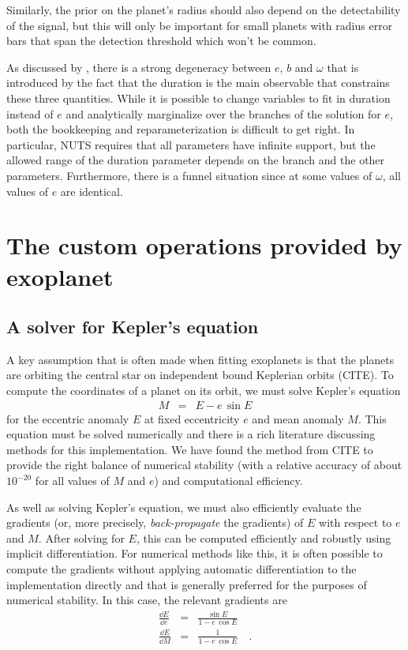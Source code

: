 \documentclass[modern]{aastex62}
\begin{document}
Similarly, the prior on the planet's radius should also depend on the detectability of the signal, but this will only be important for small planets with radius error bars that span the detection threshold which won't be common.

As discussed by , there is a strong degeneracy between $e$, $b$ and $\omega$ that is introduced by the fact that the duration is the main observable that constrains these three quantities.
While it is possible to change variables to fit in duration instead of $e$ and analytically marginalize over the branches of the solution for $e$, both the bookkeeping and reparameterization is difficult to get right.
In particular, NUTS requires that all parameters have infinite support, but the allowed range of the duration parameter depends on the branch and the other parameters.
Furthermore, there is a funnel situation since at some values of $\omega$, all values of $e$ are identical.

\section{The custom operations provided by exoplanet}

\subsection{A solver for Kepler's equation}

A key assumption that is often made when fitting exoplanets is that the
planets are orbiting the central star on independent bound Keplerian orbits
(CITE).
To compute the coordinates of a planet on its orbit, we must solve Kepler's
equation
\begin{eqnarray}
M &=& E - e\,\sin E
\end{eqnarray}
for the eccentric anomaly $E$ at fixed eccentricity $e$ and mean anomaly $M$.
This equation must be solved numerically and there is a rich literature
discussing methods for this implementation.
We have found the method from CITE to provide the right balance of numerical
stability (with a relative accuracy of about $10^{-20}$ for all values of $M$
and $e$) and computational efficiency.

As well as solving Kepler's equation, we must also efficiently evaluate the
gradients (or, more precisely, \emph{back-propagate} the gradients) of $E$
with respect to $e$ and $M$.
After solving for $E$, this can be computed efficiently and robustly using
implicit differentiation.
For numerical methods like this, it is often possible to compute the gradients
without applying automatic differentiation to the implementation directly and
that is generally preferred for the purposes of numerical stability.
In this case, the relevant gradients are
\begin{eqnarray}
\frac{\dd E}{\dd e} &=& \frac{\sin E}{1 - e\,\cos E} \\
\frac{\dd E}{\dd M} &=& \frac{1}{1 - e\,\cos E} \quad.
\end{eqnarray}
\end{document}
